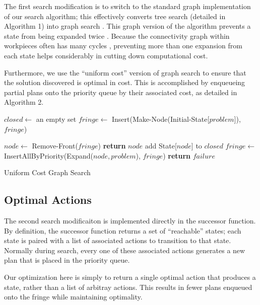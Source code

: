 The first search modification is to switch to the standard graph implementation of our search algorithm; this effectively converts tree search (detailed in Algorithm 1) into graph search \cite{AIBook}. This graph version of the algorithm prevents a state from being expanded twice \cite{AIBook}. Because the connectivity graph within workpieces often has many cycles \cite{Yasui2011}, preventing more than one expansion from each state helps considerably in cutting down computational cost.

Furthermore, we use the ``uniform cost'' version of graph search \cite{AIBook} to ensure that the solution discovered is optimal in cost. This is accomplished by enqueueing partial plans onto the priority queue by their associated cost, as detailed in Algorithm 2.

\begin{algorithm}[H]\label{graphSearch}
\begin{algorithmic}[1]
	\State $closed \gets$ an empty set
	\State $fringe \gets$ Insert(Make-Node(Initial-State[$problem$]),$fringe$)

		\State $node \gets$ Remove-Front($fringe$)
			\State \textbf{return} $node$ 
		\EndIf
			\State add State[$node$] to $closed$
			\State $fringe \gets$ InsertAllByPriority(Expand($node, problem$), $fringe$)
		\EndIf
	\EndWhile
	\State \textbf{return} $failure$ 

\EndFunction

\end{algorithmic}
\caption{Uniform Cost Graph Search}
\end{algorithm}

	\subsection{Optimal Actions}

The second search modificaiton is implemented directly in the successor function. By definition, the successor function returns a set of ``reachable'' states; each state is paired with a list of associated actions to transition to that state. Normally during search, every one of these associated actions generates a new plan that is placed in the priority queue.

Our optimization here is simply to return a single optimal action that produces a state, rather than a list of arbitray actions. This results in fewer plans enqueued onto the fringe while maintaining optimality.

